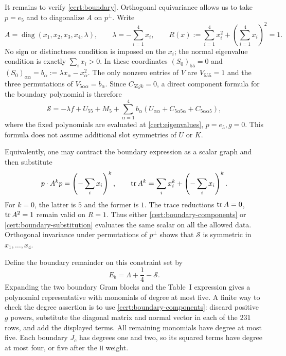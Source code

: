 It remains to verify \eqref{cert:boundary}.  Orthogonal equivariance allows
us to take $p=e_5$ and to diagonalize $A$ on $p^\perp$.  Write
\begin{equation}\label{cert:eigenvalues}
 A=\operatorname{diag}(x_1,x_2,x_3,x_4,\lambda),\qquad
 \lambda=-\sum_{i=1}^4x_i,
 \qquad R(x):=\sum_{i=1}^4x_i^2+\left(\sum_{i=1}^4x_i\right)^2=1.
\end{equation}
No sign or distinctness condition is imposed on the $x_i$; the normal
eigenvalue condition is exactly $\sum_i x_i>0$.
In these coordinates $(S_0)_{55}=0$ and
$(S_0)_{\alpha\alpha}=b_\alpha:=\lambda x_\alpha-x_\alpha^2$.
The only nonzero entries of $V$ are $V_{555}=1$ and the three permutations
of $V_{5\alpha\alpha}=b_\alpha$.  Since $C_{55jk}=0$, a direct component
formula for the boundary polynomial is therefore
\begin{equation}\label{cert:boundary-components}
 \mathcal S=-\lambda f+U_{55}+M_5+
       \sum_{\alpha=1}^4 b_\alpha
          (U_{\alpha\alpha}+C_{5\alpha5\alpha}
                                      +C_{5\alpha\alpha5}),
\end{equation}
where the fixed polynomials are evaluated at \eqref{cert:eigenvalues},
$p=e_5,g=0$.  This formula does not assume additional slot symmetries of
$U$ or $K$.

Equivalently, one may contract the boundary expression as a scalar graph
and then substitute
\begin{equation}\label{cert:boundary-substitution}
 p\cdot A^kp=\left(-\sum_i x_i\right)^k,\qquad
 \operatorname{tr} A^k=\sum_i x_i^k+\left(-\sum_i x_i\right)^k.
\end{equation}
For $k=0$, the latter is $5$ and the former is $1$.  The trace reductions
$\operatorname{tr} A=0$, $\operatorname{tr} A^2=1$ remain valid on $R=1$.  Thus either
\eqref{cert:boundary-components} or \eqref{cert:boundary-substitution}
evaluates the same scalar on all the allowed data.  Orthogonal invariance
under permutations of $p^\perp$ shows that $\mathcal S$ is symmetric in
$x_1,\ldots,x_4$.

Define the boundary remainder on this constraint set by
\[
 E_b=\Lambda+\frac14-\mathcal S.
\]
Expanding the two boundary Gram blocks and the Table~I expression gives a
polynomial representative with monomials of degree at most five.  A finite
way to check the degree assertion is to use
\eqref{cert:boundary-components}: discard positive $g$ powers, substitute
the diagonal matrix and normal vector in each of the $231$ rows, and add
the displayed terms.  All remaining monomials have degree at most five.
Each boundary $J_c$ has degrees one and two, so its squared terms have
degree at most four, or five after the $\texttt{H}$ weight.

